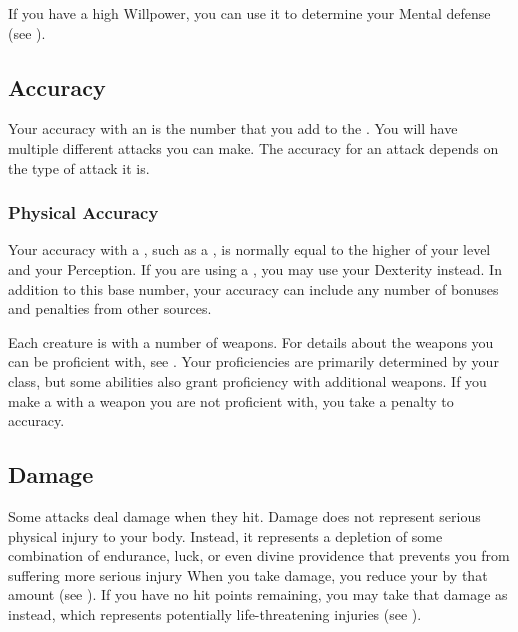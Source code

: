             If you have a high Willpower, you can use it to determine your Mental defense (see ).

    \subsection{Accuracy}\label{Accuracy}
        Your accuracy with an  is the number that you add to the .
        You will have multiple different attacks you can make.
        The accuracy for an attack depends on the type of attack it is.

        \subsubsection{Physical Accuracy}\label{Physical Accuracy}
            Your accuracy with a , such as a , is normally equal to the higher of your level and your Perception.
            If you are using a , you may use your Dexterity instead.
            In addition to this base number, your accuracy can include any number of bonuses and penalties from other sources.

             Each creature is  with a number of weapons.
            For details about the weapons you can be proficient with, see .
            Your proficiencies are primarily determined by your class, but some abilities also grant proficiency with additional weapons.
            If you make a  with a weapon you are not proficient with, you take a  penalty to accuracy.

    \subsection{Damage}\label{Damage}
        Some attacks deal damage when they hit.
        Damage does not represent serious physical injury to your body.
        Instead, it represents a depletion of some combination of endurance, luck, or even divine providence that prevents you from suffering more serious injury
        When you take damage, you reduce your  by that amount (see ).
        If you have no hit points remaining, you may take that damage as  instead, which represents potentially life-threatening injuries (see ).

